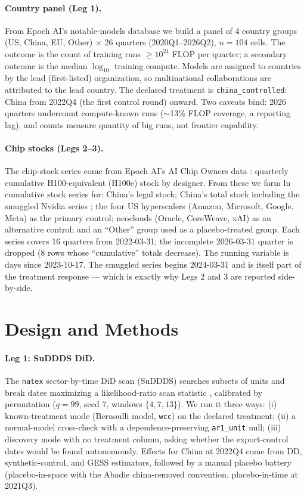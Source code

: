 \documentclass[11pt]{article}
\newcommand{\natex}{\texttt{natex}}
\begin{document}
\paragraph{Country panel (Leg 1).} From Epoch AI's notable-models database
\cite{epochmodels} we build a panel of 4 country groups (US, China, EU,
Other) $\times$ 26 quarters (2020Q1--2026Q2), $n=104$ cells. The outcome is
the count of training runs $\geq 10^{24}$ FLOP per quarter; a secondary
outcome is the median $\log_{10}$ training compute. Models are assigned to
countries by the lead (first-listed) organization, so multinational
collaborations are attributed to the lead country. The declared treatment is
\texttt{china\_controlled}: China from 2022Q4 (the first control round)
onward. Two caveats bind: 2026 quarters undercount compute-known runs
($\sim$13\% FLOP coverage, a reporting lag), and counts measure quantity of
big runs, not frontier capability.

\paragraph{Chip stocks (Legs 2--3).} The chip-stock series come from Epoch
AI's AI Chip Owners data \cite{epochchips}: quarterly cumulative
H100-equivalent (H100e) stock by designer. From these
we form ln cumulative stock series for: China's legal stock; China's total
stock including the smuggled Nvidia series \cite{juniewicz2026}; the four
US hyperscalers (Amazon, Microsoft, Google, Meta) as the primary control;
neoclouds (Oracle, CoreWeave, xAI) as an alternative control; and an
``Other'' group used as a placebo-treated group. Each series covers 16
quarters from 2022-03-31; the incomplete 2026-03-31 quarter is dropped (8
rows whose ``cumulative'' totals decrease). The running variable is days
since 2023-10-17. The smuggled series begins 2024-03-31 and is itself part
of the treatment response --- which is exactly why Legs 2 and 3 are reported
side-by-side.

\section{Design and Methods}\label{sec:methods}

\paragraph{Leg 1: SuDDDS DiD.} The \natex{} sector-by-time DiD scan (SuDDDS)
searches subsets of units and break dates maximizing a likelihood-ratio scan
statistic \cite{herlands2018}, calibrated by permutation ($q=99$, seed 7,
windows $\{4,7,13\}$). We run it three ways: (i) known-treatment mode
(Bernoulli model, \texttt{wcc}) on the declared treatment; (ii) a
normal-model cross-check with a dependence-preserving \texttt{ar1\_unit}
null; (iii) discovery mode with no treatment column, asking whether the
export-control dates would be found autonomously. Effects for China at 2022Q4
come from DD, synthetic-control, and GESS estimators, followed by a manual
placebo battery (placebo-in-space with the Abadie china-removed convention,
placebo-in-time at 2021Q3).
\end{document}
